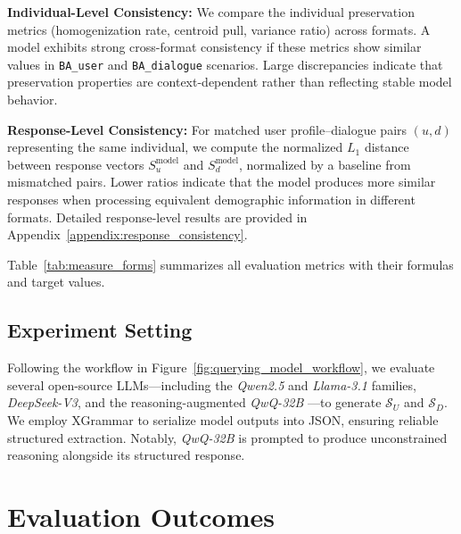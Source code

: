 \documentclass[acmlarge]{acmart}
\newcommand{\paratitle}[1]{\par\smallskip\noindent\textbf{#1}}
\begin{document}
\paratitle{Individual-Level Consistency:}
We compare the individual preservation metrics (homogenization rate, centroid pull, variance ratio) across formats. A model exhibits strong cross-format consistency if these metrics show similar values in \texttt{BA\_user} and \texttt{BA\_dialogue} scenarios. Large discrepancies indicate that preservation properties are context-dependent rather than reflecting stable model behavior.

\paratitle{Response-Level Consistency:}
For matched user profile--dialogue pairs $(u, d)$ representing the same individual, we compute the normalized $L_1$ distance between response vectors $S_u^{\text{model}}$ and $S_d^{\text{model}}$, normalized by a baseline from mismatched pairs. Lower ratios indicate that the model produces more similar responses when processing equivalent demographic information in different formats. Detailed response-level results are provided in Appendix~\ref{appendix:response_consistency}.

Table~\ref{tab:measure_forms} summarizes all evaluation metrics with their formulas and target values.

\subsection{Experiment Setting}

Following the workflow in Figure~\ref{fig:querying_model_workflow}, we evaluate several open-source LLMs---including the \textit{Qwen2.5} and \textit{Llama-3.1} families, \textit{DeepSeek-V3}, and the reasoning-augmented \textit{QwQ-32B} \citep{qwen2025qwen25technicalreport, dubey2024llama3herdmodels, deepseekai2025deepseekv3technicalreport}---to generate $\mathcal{S}_U$ and $\mathcal{S}_D$. We employ XGrammar \citep{dong2025xgrammar} to serialize model outputs into JSON, ensuring reliable structured extraction. Notably, \textit{QwQ-32B} is prompted to produce unconstrained reasoning alongside its structured response.

\section{Evaluation Outcomes}
\label{sec:evaluation_outcomes}
\end{document}
